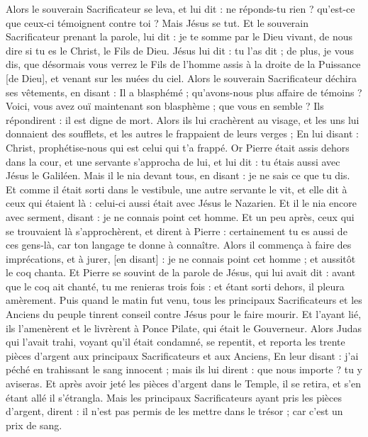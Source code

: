 \begin{multicols}{2}
Alors le souverain Sacrificateur se leva, et lui dit : ne réponds-tu rien ? qu'est-ce que ceux-ci témoignent contre toi ?
Mais Jésus se tut. Et le souverain Sacrificateur prenant la parole, lui dit : je te somme par le Dieu vivant, de nous dire si tu es le Christ, le Fils de Dieu.
Jésus lui dit : tu l'as dit ; de plus, je vous dis, que désormais vous verrez le Fils de l'homme assis à la droite de la Puissance [de Dieu], et venant sur les nuées du ciel.
Alors le souverain Sacrificateur déchira ses vêtements, en disant : Il a blasphémé ; qu'avons-nous plus affaire de témoins ? Voici, vous avez ouï maintenant son blasphème ; que vous en semble ?
Ils répondirent : il est digne de mort.
Alors ils lui crachèrent au visage, et les uns lui donnaient des soufflets, et les autres le frappaient de leurs verges ;
En lui disant : Christ, prophétise-nous qui est celui qui t'a frappé.
Or Pierre était assis dehors dans la cour, et une servante s'approcha de lui, et lui dit : tu étais aussi avec Jésus le Galiléen.
Mais il le nia devant tous, en disant : je ne sais ce que tu dis.
Et comme il était sorti dans le vestibule, une autre servante le vit, et elle dit à ceux qui étaient là : celui-ci aussi était avec Jésus le Nazarien.
Et il le nia encore avec serment, disant : je ne connais point cet homme.
Et un peu après, ceux qui se trouvaient là s'approchèrent, et dirent à Pierre : certainement tu es aussi de ces gens-là, car ton langage te donne à connaître.
Alors il commença à faire des imprécations, et à jurer, [en disant] : je ne connais point cet homme ; et aussitôt le coq chanta.
Et Pierre se souvint de la parole de Jésus, qui lui avait dit : avant que le coq ait chanté, tu me renieras trois fois : et étant sorti dehors, il pleura amèrement.
\VerseOne{}Puis quand le matin fut venu, tous les principaux Sacrificateurs et les Anciens du peuple tinrent conseil contre Jésus pour le faire mourir.
Et l'ayant lié, ils l'amenèrent et le livrèrent à Ponce Pilate, qui était le Gouverneur.
Alors Judas qui l'avait trahi, voyant qu'il était condamné, se repentit, et reporta les trente pièces d'argent aux principaux Sacrificateurs et aux Anciens,
En leur disant : j'ai péché en trahissant le sang innocent ; mais ils lui dirent : que nous importe ? tu y aviseras.
Et après avoir jeté les pièces d'argent dans le Temple, il se retira, et s'en étant allé il s'étrangla.
Mais les principaux Sacrificateurs ayant pris les pièces d'argent, dirent : il n'est pas permis de les mettre dans le trésor ; car c'est un prix de sang.

\end{multicols}
